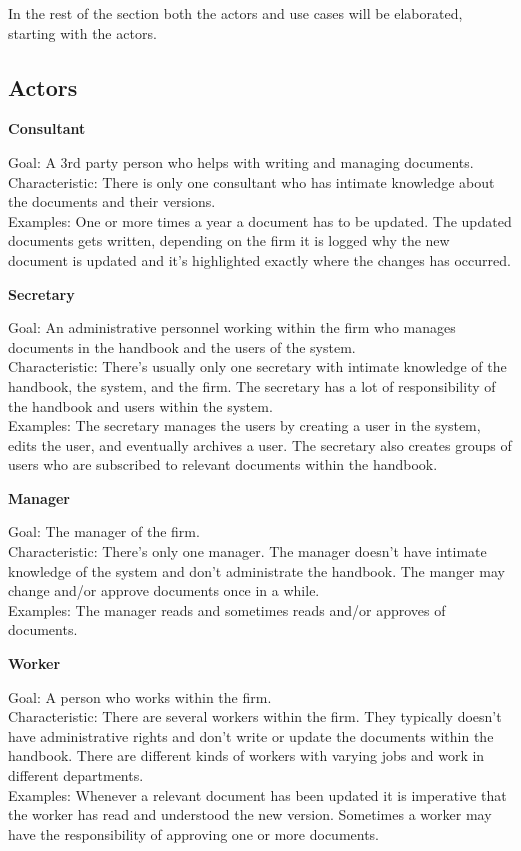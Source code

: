 In the rest of the section both the actors and use cases will be elaborated, starting with the actors.

\subsection{Actors}

\textbf{Consultant}

Goal: A 3rd party person who helps with writing and managing documents.
\\
Characteristic: There is only one consultant who has intimate knowledge about the documents and their versions.
\\
Examples: One or more times a year a document has to be updated. The updated documents gets written, depending on the firm it is logged why the new document is updated and it’s highlighted exactly where the changes has occurred.

\textbf{Secretary}

Goal: An administrative personnel working within the firm who manages documents in the handbook and the users of the system.
\\
Characteristic: There’s usually only one secretary with intimate knowledge of the handbook, the system, and the firm. The secretary has a lot of responsibility of the handbook and users within the system.
\\
Examples: The secretary manages the users by creating a user in the system, edits the user, and eventually archives a user. 
The secretary also creates groups of users who are subscribed to relevant documents within the handbook.

\textbf{Manager}

Goal: The manager of the firm.
\\
Characteristic: There’s only one manager. The manager doesn’t have intimate knowledge of the system and don’t administrate the handbook. 
The manger may change and/or approve documents once in a while.
\\
Examples: The manager reads and sometimes reads and/or approves of documents.

\textbf{Worker}

Goal: A person who works within the firm.
\\
Characteristic: There are several workers within the firm. They typically doesn’t have administrative rights and don’t write or update the documents within the handbook. There are different kinds of workers with varying jobs and work in different departments.
\\
Examples: Whenever a relevant document has been updated it is imperative that the worker has read and understood the new version. 
Sometimes a worker may have the responsibility of approving one or more documents.

